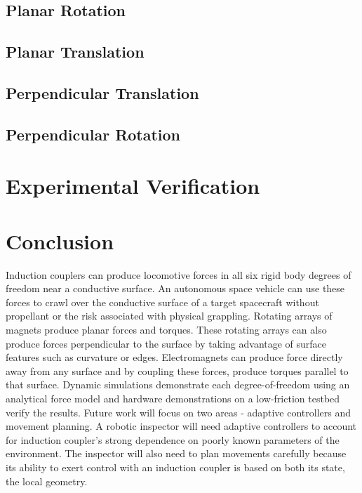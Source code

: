 \documentclass[10pt]{article}
\begin{document}
\subsection{Planar Rotation}
\subsection{Planar Translation}
\subsection{Perpendicular Translation}
\subsection{Perpendicular Rotation}
\section{Experimental Verification}
\section{Conclusion}
Induction couplers can produce locomotive forces in all six rigid body degrees of freedom near a conductive surface. An autonomous space vehicle can use these forces to crawl over the conductive surface of a target spacecraft without propellant or the risk associated with physical grappling. Rotating arrays of magnets produce planar forces and torques. These rotating arrays can also produce forces perpendicular to the surface by taking advantage of surface features such as curvature or edges. Electromagnets can produce force directly away from any surface and by coupling these forces, produce torques parallel to that surface. Dynamic simulations demonstrate each degree-of-freedom using an analytical force model and hardware demonstrations on a low-friction testbed verify the results. 
Future work will focus on two areas - adaptive controllers and movement planning. A robotic inspector will need adaptive controllers to account for induction coupler's strong dependence on poorly known parameters of the environment.  The inspector will also need to plan movements carefully because its ability to exert control with an induction coupler is based on both its state, the local geometry.      
\end{document}
